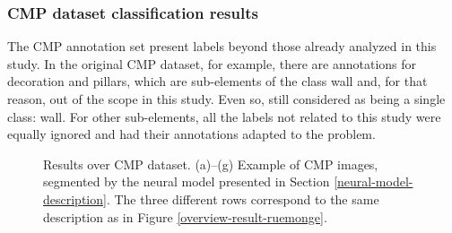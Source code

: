 \subsubsection{CMP dataset classification results}
The CMP annotation set present labels beyond those already analyzed in this study. In the original CMP dataset, for example, there are annotations for decoration and pillars, which are sub-elements of the class wall and, for that reason, out of the scope in this study. Even so, still considered as being a single class: wall. For other sub-elements, all the labels not related to this study were equally ignored and had their annotations adapted to the problem.
\begin{figure}[!htp]
    \centering	       
    \caption{Results over CMP dataset. (a)--(g) Example of CMP images, segmented by the neural model presented in Section \ref{neural-model-description}. The three different rows correspond to the same description as in Figure \ref{overview-result-ruemonge}.}
    \vspace{6mm}
	\legenda{}
    \label{overview-result-cmp}
\end{figure}


